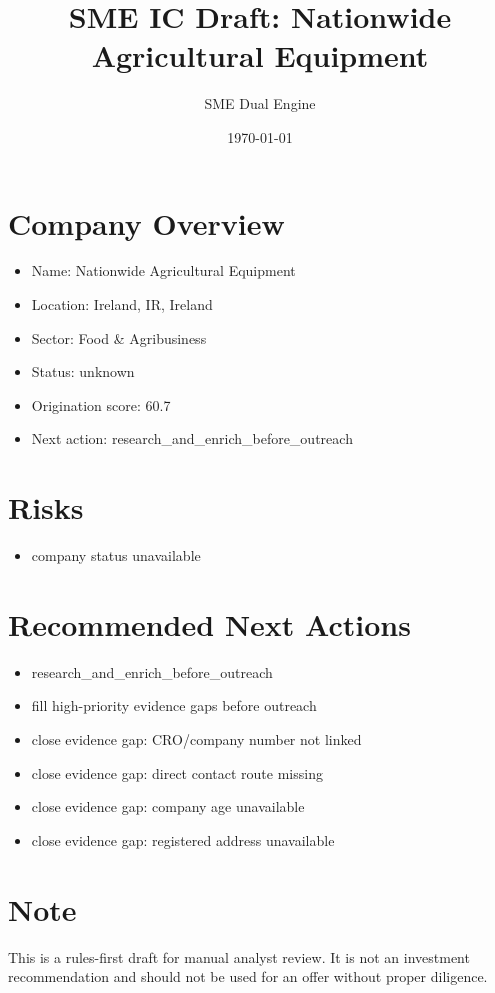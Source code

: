 \documentclass[11pt,a4paper]{article}
\title{SME IC Draft: Nationwide Agricultural Equipment}
\author{SME Dual Engine}
\date{\today}
\begin{document}
\maketitle
\section*{Company Overview}
\begin{itemize}[leftmargin=1.4em]
\item Name: Nationwide Agricultural Equipment
\item Location: Ireland, IR, Ireland
\item Sector: Food \& Agribusiness
\item Status: unknown
\item Origination score: 60.7
\item Next action: research\_and\_enrich\_before\_outreach
\end{itemize}
\section*{Risks}
\begin{itemize}[leftmargin=1.4em]
\item company status unavailable
\end{itemize}
\section*{Recommended Next Actions}
\begin{itemize}[leftmargin=1.4em]
\item research\_and\_enrich\_before\_outreach
\item fill high-priority evidence gaps before outreach
\item close evidence gap: CRO/company number not linked
\item close evidence gap: direct contact route missing
\item close evidence gap: company age unavailable
\item close evidence gap: registered address unavailable
\end{itemize}
\section*{Note}
This is a rules-first draft for manual analyst review. It is not an investment
recommendation and should not be used for an offer without proper diligence.
\end{document}
